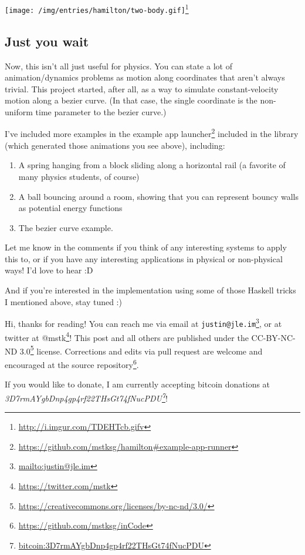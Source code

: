 \documentclass[]{article}
\renewcommand{\href}[2]{#2\footnote{\url{#1}}}
\begin{document}
\href{http://i.imgur.com/TDEHTcb.gifv}{\texttt{[image: /img/entries/hamilton/two-body.gif]}}

\hypertarget{just-you-wait}{%
\subsection{Just you wait}\label{just-you-wait}}

Now, this isn't all just useful for physics. You can state a lot of
animation/dynamics problems as motion along coordinates that aren't always
trivial. This project started, after all, as a way to simulate constant-velocity
motion along a bezier curve. (In that case, the single coordinate is the
non-uniform time parameter to the bezier curve.)

I've included more examples in the
\href{https://github.com/mstksg/hamilton\#example-app-runner}{example app
launcher} included in the library (which generated those animations you see
above), including:

\begin{enumerate}
\def\labelenumi{\arabic{enumi}.}
\tightlist
\item
  A spring hanging from a block sliding along a horizontal rail (a favorite of
  many physics students, of course)
\item
  A ball bouncing around a room, showing that you can represent bouncy walls as
  potential energy functions
\item
  The bezier curve example.
\end{enumerate}

Let me know in the comments if you think of any interesting systems to apply
this to, or if you have any interesting applications in physical or non-physical
ways! I'd love to hear :D

And if you're interested in the implementation using some of those Haskell
tricks I mentioned above, stay tuned :)

Hi, thanks for reading! You can reach me via email at
\href{mailto:justin@jle.im}{\nolinkurl{justin@jle.im}}, or at twitter at
\href{https://twitter.com/mstk}{@mstk}! This post and all others are published
under the \href{https://creativecommons.org/licenses/by-nc-nd/3.0/}{CC-BY-NC-ND
3.0} license. Corrections and edits via pull request are welcome and encouraged
at \href{https://github.com/mstksg/inCode}{the source repository}.

If you would like to donate, I am currently accepting bitcoin donations at
\emph{\href{bitcoin:3D7rmAYgbDnp4gp4rf22THsGt74fNucPDU}{3D7rmAYgbDnp4gp4rf22THsGt74fNucPDU}}!
\end{document}
